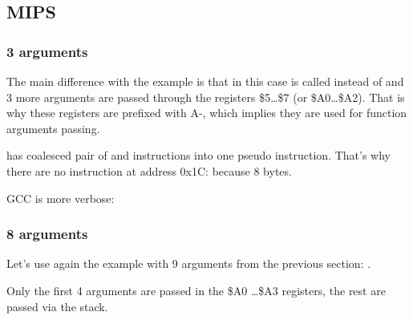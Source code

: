 \subsection{MIPS}

\subsubsection{3 arguments}


The main difference with the \q{\HelloWorldSectionName} example is that in this case \printf is called
instead of \puts and 3 more arguments are passed through the registers \$5\dots \$7 (or \$A0\dots \$A2).
That is why these registers are prefixed with A-, which implies they are used for function arguments passing.





\IDA has coalesced pair of  and  instructions into one  pseudo instruction.
That's why there are no instruction at address 0x1C: because   8 bytes.


\NonOptimizing GCC is more verbose:





\subsubsection{8 arguments}

Let's use again the example with 9 arguments from the previous section: .




Only the first 4 arguments are passed in the \$A0 \dots \$A3 registers, the rest are passed via the stack.

